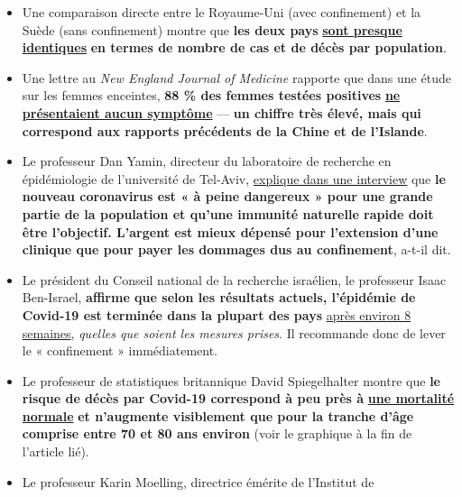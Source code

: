 \begin{itemize}
{  dans les unités de soins intensifs de tous les hôpitaux de Stockholm}.
  Nous approchons de la stabilisation de la courbe du Covid-19 », a
  expliqué un médecin en chef de la Karolinska Klinik. Jusqu'à présent,
  il y a eu environ 900 décès \emph{avec} le Covid-19 en Suède.
\item
  Une comparaison directe entre le Royaume-Uni (avec confinement) et la
  Suède (sans confinement) montre que \textbf{les deux pays}
  \href{http://www.theblogmire.com/a-comparison-of-lockdown-uk-with-non-lockdown-sweden/}{\textbf{sont
  presque identiques}} \textbf{en termes de nombre de cas et de décès
  par population}.
\item
  Une lettre au \emph{New England Journal of Medicine} rapporte que dans
  une étude sur les femmes enceintes, \textbf{88 \% des femmes testées
  positives}
  \href{https://www.nejm.org/doi/full/10.1056/NEJMc2009316}{\textbf{ne
  présentaient aucun symptôme}} --- \textbf{un chiffre très élevé, mais
  qui correspond aux rapports précédents de la Chine et de l'Islande}.
\item
  Le professeur Dan Yamin, directeur du laboratoire de recherche en
  épidémiologie de l'université de Tel-Aviv,
  \href{https://www.ynet.co.il/articles/0,7340,L-5714371,00.html}{explique
  dans une interview} que \textbf{le nouveau coronavirus est « à peine
  dangereux » pour une grande partie de la population et qu'une immunité
  naturelle rapide doit être l'objectif. L'argent est mieux dépensé pour
  l'extension d'une clinique que pour payer les dommages dus au
  confinement}, a-t-il dit.
\item
  Le président du Conseil national de la recherche israélien, le
  professeur Isaac Ben-Israel, \textbf{affirme que selon les résultats
  actuels, l'épidémie de Covid-19 est terminée dans la plupart des pays}
  \href{http://www.israelnationalnews.com/News/News.aspx/278658}{après
  environ 8 semaines}, \emph{quelles que soient les mesures prises}. Il
  recommande donc de lever le « confinement » immédiatement.
\item
  Le professeur de statistiques britannique David Spiegelhalter montre
  que \textbf{le risque de décès par Covid-19 correspond à peu près à}
  \href{https://medium.com/wintoncentre/how-much-normal-risk-does-covid-represent-4539118e1196}{\textbf{une
  mortalité normale}} \textbf{et n'augmente visiblement que pour la
  tranche d'âge comprise entre 70 et 80 ans environ} (voir le graphique
  à la fin de l'article lié).
\item
  Le professeur Karin Moelling, directrice émérite de l'Institut de

\end{itemize}
